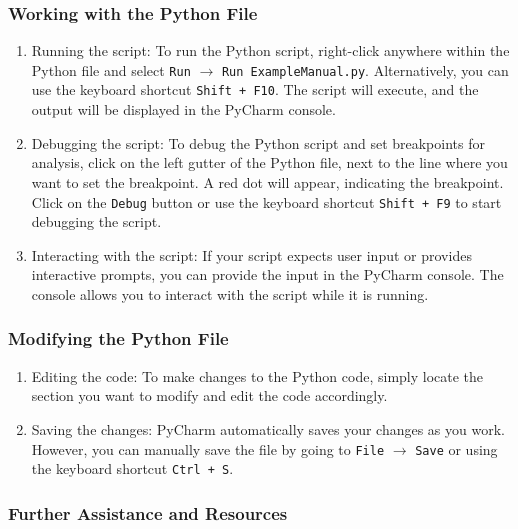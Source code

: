 		\subsubsection{Working with the Python File}
		
		\begin{enumerate}
			
			\item Running the script: To run the Python script, right-click anywhere within the Python file and select \texttt{Run} $\rightarrow$ \texttt{Run ExampleManual.py}. Alternatively, you can use the keyboard shortcut \texttt{Shift + F10}. The script will execute, and the output will be displayed in the PyCharm console.
			
			\item Debugging the script: To debug the Python script and set breakpoints for analysis, click on the left gutter of the Python file, next to the line where you want to set the breakpoint. A red dot will appear, indicating the breakpoint. Click on the \texttt{Debug} button or use the keyboard shortcut \texttt{Shift + F9} to start debugging the script.
			
			\item Interacting with the script: If your script expects user input or provides interactive prompts, you can provide the input in the PyCharm console. The console allows you to interact with the script while it is running.
			
		\end{enumerate}
		
		\subsubsection{Modifying the Python File}
		
		\begin{enumerate}
			
			\item Editing the code: To make changes to the Python code, simply locate the section you want to modify and edit the code accordingly.
			
			\item Saving the changes: PyCharm automatically saves your changes as you work. However, you can manually save the file by going to \texttt{File} $\rightarrow$ \texttt{Save} or using the keyboard shortcut \texttt{Ctrl + S}.
			
		\end{enumerate}
		
		\subsubsection{Further Assistance and Resources}
		

